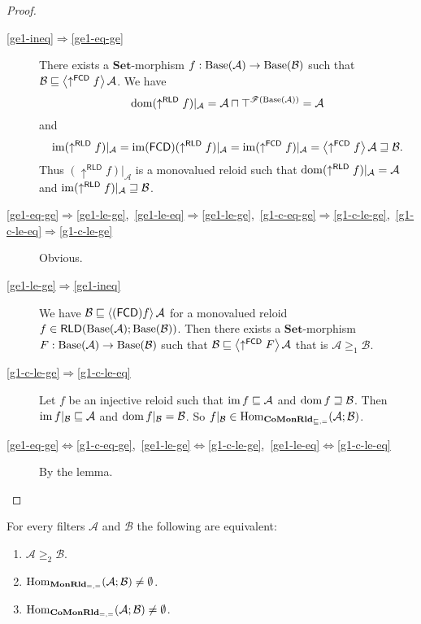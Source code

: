 \begin{proof}
~
\begin{description}
\item [{\ref{ge1-ineq}$\Rightarrow$\ref{ge1-eq-ge}}] There exists a
$\mathbf{Set}$-morphism $f:\operatorname{Base}(\mathcal{A})\rightarrow\operatorname{Base}(\mathcal{B})$
such that $\mathcal{B}\sqsubseteq\left\langle \uparrow^{\mathsf{FCD}}f\right\rangle\mathcal{A}$.
We have
\[
\operatorname{dom}(\uparrow^{\mathsf{RLD}}f)|_{\mathcal{A}}=\mathcal{A}\sqcap\top^{\mathscr{F}(\operatorname{Base}(\mathcal{A}))}=\mathcal{A}
\]
and
\[
\operatorname{im}(\uparrow^{\mathsf{RLD}}f)|_{\mathcal{A}}=\operatorname{im}(\mathsf{FCD})(\uparrow^{\mathsf{RLD}}f)|_{\mathcal{A}}=\operatorname{im}(\uparrow^{\mathsf{FCD}}f)|_{\mathcal{A}}=\left\langle \uparrow^{\mathsf{FCD}}f\right\rangle\mathcal{A}\sqsupseteq\mathcal{B}.
\]
Thus $(\uparrow^{\mathsf{RLD}}f)|_{\mathcal{A}}$ is a monovalued
reloid such that $\operatorname{dom}(\uparrow^{\mathsf{RLD}}f)|_{\mathcal{A}}=\mathcal{A}$
and $\operatorname{im}(\uparrow^{\mathsf{RLD}}f)|_{\mathcal{A}}\sqsupseteq\mathcal{B}$.
\item [{\ref{ge1-eq-ge}$\Rightarrow$\ref{ge1-le-ge},~\ref{ge1-le-eq}$\Rightarrow$\ref{ge1-le-ge},~\ref{g1-c-eq-ge}$\Rightarrow$\ref{g1-c-le-ge},~\ref{g1-c-le-eq}$\Rightarrow$\ref{g1-c-le-ge}}] Obvious.
\item [{\ref{ge1-le-ge}$\Rightarrow$\ref{ge1-ineq}}] We have $\mathcal{B}\sqsubseteq\left\langle (\mathsf{FCD}) f\right\rangle\mathcal{A}$
for a monovalued reloid $f\in\mathsf{RLD}(\operatorname{Base}(\mathcal{A});\operatorname{Base}(\mathcal{B}))$.
Then there exists a $\mathbf{Set}$-morphism $F:\operatorname{Base}(\mathcal{A})\rightarrow\operatorname{Base}(\mathcal{B})$
such that $\mathcal{B}\sqsubseteq\left\langle \uparrow^{\mathsf{FCD}}F\right\rangle\mathcal{A}$
that is $\mathcal{A}\ge_{1}\mathcal{B}$.
\item [{\ref{g1-c-le-ge}$\Rightarrow$\ref{g1-c-le-eq}}] Let $f$ be an injective reloid such that
$\operatorname{im} f\sqsubseteq\mathcal{A}$ and $\operatorname{dom} f\sqsupseteq\mathcal{B}$. Then
$\operatorname{im} f|_{\mathcal{B}}\sqsubseteq\mathcal{A}$ and $\operatorname{dom} f|_{\mathcal{B}}=\mathcal{B}$.
So $f|_{\mathcal{B}}\in\operatorname{Hom}_{\mathbf{CoMonRld}_{\sqsubseteq,=}}(\mathcal{A};\mathcal{B})$.
\item [{\ref{ge1-eq-ge}$\Leftrightarrow$\ref{g1-c-eq-ge},~\ref{ge1-le-ge}$\Leftrightarrow$\ref{g1-c-le-ge},~\ref{ge1-le-eq}$\Leftrightarrow$\ref{g1-c-le-eq}}] By
the lemma.
\end{description}
\end{proof}
\begin{thm}
For every filters $\mathcal{A}$ and $\mathcal{B}$ the following
are equivalent:
\begin{enumerate}
\item \label{ge2-in}$\mathcal{A}\ge_{2}\mathcal{B}$.
\item \label{ge2-mon}$\operatorname{Hom}_{\mathbf{MonRld}_{=,=}}(\mathcal{A};\mathcal{B})\ne\emptyset$.
\item \label{ge2-comon}$\operatorname{Hom}_{\mathbf{CoMonRld}_{=,=}}(\mathcal{A};\mathcal{B})\ne\emptyset$.
\end{enumerate}
\end{thm}
